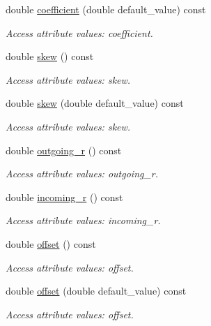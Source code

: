 \begin{DoxyCompactItemize}
double \hyperlink{struct_d_d4hep_1_1_x_m_l_1_1_dimension_ac79acf81f407b22e67430a742919eb0f}{coefficient} (double default\+\_\+value) const
\begin{DoxyCompactList}\small\item\em Access attribute values\+: coefficient. \end{DoxyCompactList}\item 
double \hyperlink{struct_d_d4hep_1_1_x_m_l_1_1_dimension_ae80086c488af219f981bcdd351064e60}{skew} () const
\begin{DoxyCompactList}\small\item\em Access attribute values\+: skew. \end{DoxyCompactList}\item 
double \hyperlink{struct_d_d4hep_1_1_x_m_l_1_1_dimension_a3a1c68aa860ce4d58e890f71a3e49ff4}{skew} (double default\+\_\+value) const
\begin{DoxyCompactList}\small\item\em Access attribute values\+: skew. \end{DoxyCompactList}\item 
double \hyperlink{struct_d_d4hep_1_1_x_m_l_1_1_dimension_a413da316c1791a2eb69234bb7215d731}{outgoing\+\_\+r} () const
\begin{DoxyCompactList}\small\item\em Access attribute values\+: outgoing\+\_\+r. \end{DoxyCompactList}\item 
double \hyperlink{struct_d_d4hep_1_1_x_m_l_1_1_dimension_a33a041def50a71bc2520f81856804561}{incoming\+\_\+r} () const
\begin{DoxyCompactList}\small\item\em Access attribute values\+: incoming\+\_\+r. \end{DoxyCompactList}\item 
double \hyperlink{struct_d_d4hep_1_1_x_m_l_1_1_dimension_a46cb9d10f0207a64759f5135a84f2bbd}{offset} () const
\begin{DoxyCompactList}\small\item\em Access attribute values\+: offset. \end{DoxyCompactList}\item 
double \hyperlink{struct_d_d4hep_1_1_x_m_l_1_1_dimension_aef4ee2fa8e9cccea944d648305df69fc}{offset} (double default\+\_\+value) const
\begin{DoxyCompactList}\small\item\em Access attribute values\+: offset. \end{DoxyCompactList}\item 

\end{DoxyCompactItemize}
